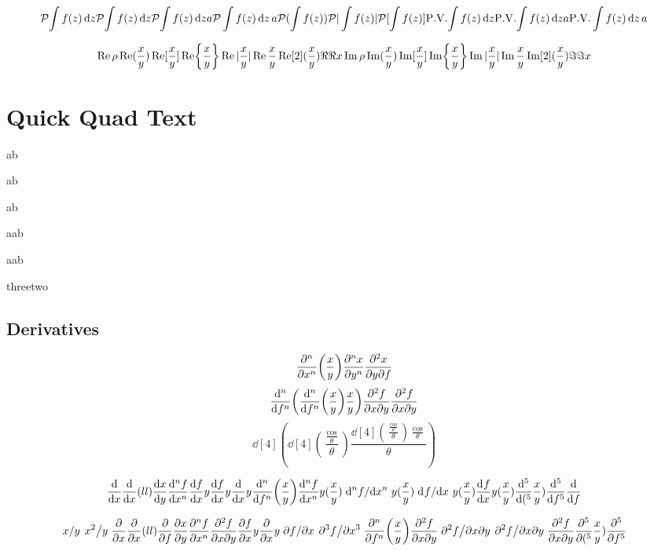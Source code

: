 \documentclass{article}
\begin{document}
\[
  \principalvalue{\int f(z) \dd{z}}
  \pv{\int f(z) \dd{z}}
  \pv{\int f(z) \dd{z}}a
  \pv\int f(z) \dd{z}a
  \pv(\int f(z))
  \pv|\int f(z)|
  \pv[\int f(z)]
  \PV{\int f(z) \dd{z}}
  \PV{\int f(z) \dd{z}}a
  \PV\int f(z) \dd{z}a
\]

\[
  \Re\rho
  \Re(\frac{x}{y})
  \Re[\frac{x}{y}]
  \Re{\frac{x}{y}}
  \Re|\frac{x}{y}|
  \Re \frac{x}{y}
  \Re[2](\frac{x}{y})
  \real
  \real{x}
  \Im\rho
  \Im(\frac{x}{y})
  \Im[\frac{x}{y}]
  \Im{\frac{x}{y}}
  \Im|\frac{x}{y}|
  \Im \frac{x}{y}
  \Im[2](\frac{x}{y})
  \imaginary
  \imaginary{x}
\]


\newpage
\section*{Quick Quad Text}

\qcc
\qand
a\qc b

ab

ab

a\qqtext ab

a\qqtext* ab

three\qif two



\newpage
\subsection*{Derivatives}

\[
  \pdv[n]{x}(\frac{x}{y})
  \pdv[n]{x}{y}(\frac{x}{y})
  \pdv[n]{x}{y}{f}(\frac{x}{y})
\]
\[
  \dv[n]{f}(\dv[n]{f}(\frac{x}{y})\frac{x}{y})
  \pdv[n]{f}{x}{y}(\pdv[n]{f}{x}{y}(\frac{x}{y})\frac{x}{y})
  \pdv{f}{x}{y}(\pdv{f}{x}{y}(\frac{x}{y})\frac{x}{y})
\]
\[
  \dd[4](\dd[4](\frac{\frac{\cos}{\theta}}{\theta})\frac{\dd[4](\frac{\frac{\cos}{\theta}}{\theta})\frac{\cos}{\theta}}{\theta})
\]

\[
  \dv x
  \dv x(ll)
  \dv{x}{y}
  \dv[n]{f}{x}
  \dv{f}{x}{y}
  \dv{f}{x}y
  \dv{x}y
  \dv[n]{f}(\frac{x}{y})
  \dv[n]{f}{x}{y}(\frac{x}{y})
  \dv*[n]{f}{x}{y}(\frac{x}{y})
  \dv*[]{f}{x}{y}(\frac{x}{y})
  \dv[]{f}{x}{y}(\frac{x}{y})
  \dv[5](\frac{x}{y})
  \dv[5]{f}
  \dv{f}
\]

\[
  \flatfrac{x}{y}
  \flatfrac{x^2}{y}
  \pdv x
  \pdv x(ll)
  \pdv{f}
  \pdv{x}{y}
  \pdv[n]{f}{x}
  \pdv{f}{x}{y}
  \pdv{f}{x}y
  \pdv{x}y
  \pdv*{f}{x}
  \pdv*[3]{f}{x}
  \pdv[n]{f}(\frac{x}{y})
  \pdv[n]{f}{x}{y}(\frac{x}{y})
  \pdv*[n]{f}{x}{y}(\frac{x}{y})
  \pdv*[]{f}{x}{y}(\frac{x}{y})
  \pdv[]{f}{x}{y}(\frac{x}{y})
  \pdv[5](\frac{x}{y})
  \pdv[5]{f}
\]
\end{document}
